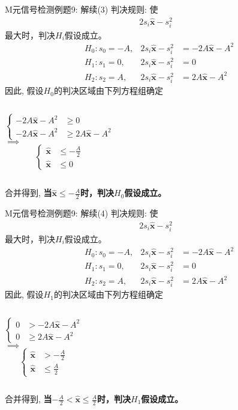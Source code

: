 \begin{frame}[shrink]{M元信号检测例题9: 解续(3)}
判决规则: 使
\begin{align*}
2s_i\bm{\hat{x}}-s_i^2
\end{align*}
最大时，判决$H_i$假设成立。
\begin{align*}
&H_0: s_0=-A, &2s_i\bm{\hat{x}}-s_i^2&=-2A\bm{\hat{x}}-A^2\\
&H_1: s_1=0, &2s_i\bm{\hat{x}}-s_i^2&=0\\
&H_2: s_2=A, &2s_i\bm{\hat{x}}-s_i^2&=2A\bm{\hat{x}}-A^2
\end{align*}
因此, 假设$H_0$的判决区域由下列方程组确定
\begin{columns}
$$
\begin{cases}
-2A\bm{\hat{x}}-A^2 &\ge 0\\
-2A\bm{\hat{x}}-A^2 &\ge 2A\bm{\hat{x}}-A^2
\end{cases}
$$
$\implies$
$$
\begin{cases}
\bm{\hat{x}}&\le -\frac{A}{2}\\
\bm{\hat{x}}&\le 0
\end{cases}
$$
\end{columns}
合并得到, \textbf{当$\bm{\hat{x}}\le -\frac{A}{2}$时，判决$H_0$假设成立。}
\end{frame}

\begin{frame}[shrink]{M元信号检测例题9: 解续(4)}
判决规则: 使
\begin{align*}
2s_i\bm{\hat{x}}-s_i^2
\end{align*}
最大时，判决$H_i$假设成立。
\begin{align*}
&H_0: s_0=-A, &2s_i\bm{\hat{x}}-s_i^2&=-2A\bm{\hat{x}}-A^2\\
&H_1: s_1=0, &2s_i\bm{\hat{x}}-s_i^2&=0\\
&H_2: s_2=A, &2s_i\bm{\hat{x}}-s_i^2&=2A\bm{\hat{x}}-A^2
\end{align*}
因此, 假设$H_1$的判决区域由下列方程组确定
\begin{columns}
$$
\begin{cases}
0&> -2A\bm{\hat{x}}-A^2\\
0&\ge 2A\bm{\hat{x}}-A^2
\end{cases}
$$
$\implies$
$$
\begin{cases}
\bm{\hat{x}}&> -\frac{A}{2}\\
\bm{\hat{x}}&\le \frac{A}{2}
\end{cases}
$$
\end{columns}
合并得到, \textbf{当$-\frac{A}{2}<\bm{\hat{x}}\le \frac{A}{2}$时，判决$H_1$假设成立。}
\end{frame}

